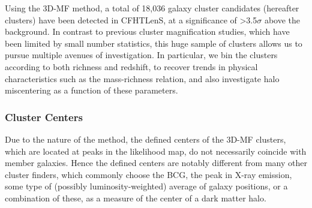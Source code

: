 Using the \ac{3D-MF} method, a total of 18,036 galaxy cluster candidates (hereafter clusters) have been detected in \ac{CFHTLenS}, at a significance of \textgreater 3.5$\sigma$ above the background. In contrast to previous cluster magnification studies, which have been limited by small number statistics, this huge sample of clusters allows us to pursue multiple avenues of investigation. In particular, we bin the clusters according to both richness and redshift, to recover trends in physical characteristics such as the mass-richness relation, and also investigate halo miscentering as a function of these parameters.

\subsubsection{Cluster Centers}
\label{sec:centering3}
Due to the nature of the method, the defined centers of the \ac{3D-MF} clusters, which are located at peaks in the likelihood map, do not necessarily coincide with member galaxies. Hence the defined centers are notably different from many other cluster finders, which commonly choose the \ac{BCG}, the peak in X-ray emission, some type of (possibly luminosity-weighted) average of galaxy positions, or a combination of these, as a measure of the center of a dark matter halo.


